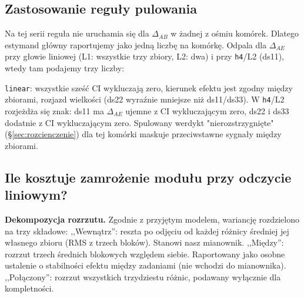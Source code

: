 \documentclass[11pt, a4paper]{article}
\begin{document}
\subsection{Zastosowanie reguły pulowania}
Na tej serii reguła nie uruchamia się dla $\Delta_{AB}$ w żadnej z ośmiu komórek. Dlatego estymand główny raportujemy jako jedną liczbę na komórkę. Odpala dla $\Delta_{AE}$ przy głowie liniowej (L1: wszystkie trzy zbiory, L2: dwa) i przy \texttt{h4}/L2 (ds11), wtedy tam podajemy trzy liczby:

\begin{table}[H]
\centering
\footnotesize
\renewcommand{\arraystretch}{1.3}
\setlength{\tabcolsep}{4pt}
\begin{minipage}{\textwidth}
\footnotesize \texttt{linear}: wszystkie sześć CI wykluczają zero, kierunek efektu jest zgodny między zbiorami, rozjazd wielkości (ds22 wyraźnie mniejsze niż ds11/ds33). W \texttt{h4}/L2 rozjeżdża się znak: ds11 ma $\Delta_{AE}$ ujemne z CI wykluczającym zero, ds22 i ds33 dodatnie z CI wykluczającym zero. Spulowany werdykt "nierozstrzygnięte" (\S\ref{sec:rozcienczenie}) dla tej komórki maskuje przeciwstawne sygnały między zbiorami.
\end{minipage}
\end{table}
\subsection{Ile kosztuje zamrożenie modułu przy odczycie liniowym?}\label{sec:h1}

\textbf{Dekompozycja rozrzutu.} Zgodnie z przyjętym modelem, wariancję rozdzielono na trzy składowe:
,,Wewnątrz'': reszta po odjęciu od każdej różnicy średniej jej własnego zbioru (RMS z trzech bloków). Stanowi nasz mianownik.
,,Między'': rozrzut trzech średnich blokowych względem siebie. Raportowany jako osobne ustalenie o stabilności efektu między zadaniami (nie wchodzi do mianownika).
,,Połączony'': rozrzut wszystkich trzydziestu różnic, podawany wyłącznie dla kompletności.
\end{document}
